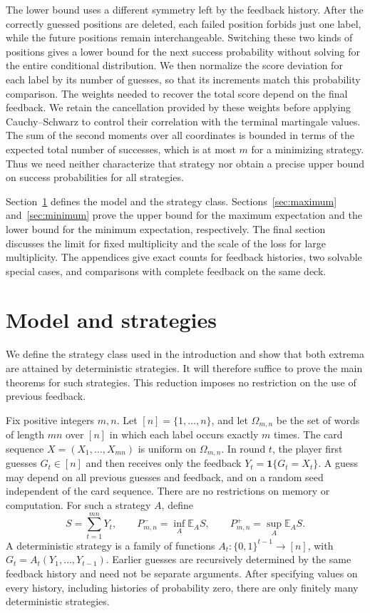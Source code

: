 \documentclass[11pt,reqno]{amsart}
\numberwithin{equation}{section}
\theoremstyle{remark}
\theoremstyle{definition}
\newcommand{\E}{\mathbb E}
\newcommand{\ind}{\mathbf 1}
\begin{document}
The lower bound uses a different symmetry left by the feedback history. After the correctly guessed positions are deleted, each failed position forbids just one label, while the future positions remain interchangeable. Switching these two kinds of positions gives a lower bound for the next success probability without solving for the entire conditional distribution. We then normalize the score deviation for each label by its number of guesses, so that its increments match this probability comparison. The weights needed to recover the total score depend on the final feedback. We retain the cancellation provided by these weights before applying Cauchy--Schwarz to control their correlation with the terminal martingale values. The sum of the second moments over all coordinates is bounded in terms of the expected total number of successes, which is at most $m$ for a minimizing strategy. Thus we need neither characterize that strategy nor obtain a precise upper bound on success probabilities for all strategies.

Section~\ref{sec:model} defines the model and the strategy class. Sections~\ref{sec:maximum} and~\ref{sec:minimum} prove the upper bound for the maximum expectation and the lower bound for the minimum expectation, respectively. The final section discusses the limit for fixed multiplicity and the scale of the loss for large multiplicity. The appendices give exact counts for feedback histories, two solvable special cases, and comparisons with complete feedback on the same deck.

\section{Model and strategies}\label{sec:model}
We define the strategy class used in the introduction and show that both extrema are attained by deterministic strategies. It will therefore suffice to prove the main theorems for such strategies. This reduction imposes no restriction on the use of previous feedback.

Fix positive integers $m,n$. Let $[n]=\{1,\ldots,n\}$, and let $\Omega_{m,n}$ be the set of words of length $mn$ over $[n]$ in which each label occurs exactly $m$ times. The card sequence $X=(X_1,\ldots,X_{mn})$ is uniform on $\Omega_{m,n}$. In round $t$, the player first guesses $G_t\in[n]$ and then receives only the feedback $Y_t=\ind\{G_t=X_t\}$. A guess may depend on all previous guesses and feedback, and on a random seed independent of the card sequence. There are no restrictions on memory or computation. For such a strategy $A$, define
\[
 S=\sum_{t=1}^{mn}Y_t,\qquad
 P^-_{m,n}=\inf_A\E_A S,\qquad P^+_{m,n}=\sup_A\E_A S.
\]
A deterministic strategy is a family of functions $A_t:\{0,1\}^{t-1}\to[n]$, with $G_t=A_t(Y_1,\ldots,Y_{t-1})$. Earlier guesses are recursively determined by the same feedback history and need not be separate arguments. After specifying values on every history, including histories of probability zero, there are only finitely many deterministic strategies.
\end{document}
